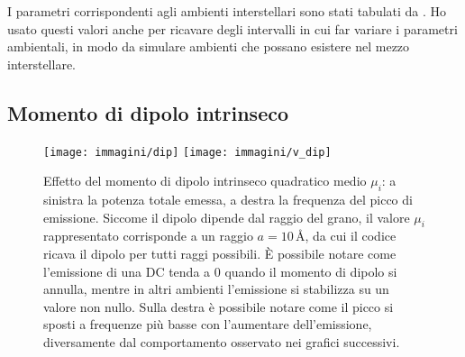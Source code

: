 I parametri corrispondenti agli ambienti interstellari sono stati tabulati da \textcite[][tab.1]{DL98b}. Ho usato questi valori anche per ricavare degli intervalli in cui far variare i parametri ambientali, in modo da simulare ambienti che possano esistere nel mezzo interstellare.

\subsection{Momento di dipolo intrinseco}
\begin{figure}
	
	\centerline{
		\centering
		\subfigure
		{\texttt{[image: immagini/dip]}}
		\hspace{-5mm}
		\subfigure
		{\texttt{[image: immagini/v\_dip]}}
	}
	\caption{Effetto del momento di dipolo intrinseco quadratico medio $\mu_i$: a sinistra la potenza totale emessa, a destra la frequenza del picco di emissione. Siccome il dipolo dipende dal raggio del grano, il valore $\mu_i$ rappresentato corrisponde a un raggio $a=10$\,\AA{}, da cui il codice ricava il dipolo per tutti raggi possibili. È possibile notare come l'emissione di una DC tenda a 0 quando il momento di dipolo si annulla, mentre in altri ambienti l'emissione si stabilizza su un valore non nullo. Sulla destra è possibile notare come il picco si sposti a frequenze più basse con l'aumentare dell'emissione, diversamente dal comportamento osservato nei grafici successivi.}
	\label{plotdip}
\end{figure}

